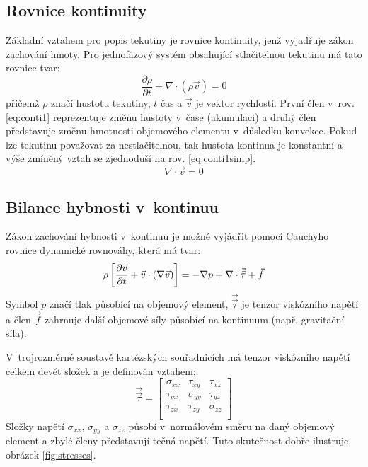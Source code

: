 \subsection{Rovnice kontinuity}

Základní vztahem pro popis tekutiny je rovnice kontinuity, jenž vyjadřuje zákon zachování hmoty. Pro jednofázový systém obsahující stlačitelnou tekutinu má tato rovnice tvar:
\begin{equation}
	\frac{\partial \rho}{\partial t} + \nabla \cdot (\rho\vec{v}) = 0
	\label{eq:conti1}
\end{equation}
přičemž $\rho$ značí hustotu tekutiny, $t$ čas a $\vec{v}$ je vektor rychlosti. První člen v~rov. \ref{eq:conti1} reprezentuje změnu hustoty v~čase (akumulaci) a druhý člen představuje změnu hmotnosti objemového elementu v~důsledku konvekce. Pokud lze tekutinu považovat za nestlačitelnou, tak hustota kontinua je konstantní a výše zmíněný vztah se zjednoduší na rov. \ref{eq:conti1simp}.
\begin{equation}
	\nabla \cdot \vec{v} = 0
	\label{eq:conti1simp}
\end{equation}  

\subsection{Bilance hybnosti v~kontinuu}
Zákon zachování hybnosti v~kontinuu je možné vyjádřit pomocí Cauchyho rovnice dynamické rovnováhy, která má tvar:
\begin{equation}
    \rho \left[ \frac{\partial \vec{v}}{\partial t} + \vec{v} \cdot \left( \nabla \vec{v} \right) \right] = -\nabla p +  \nabla \cdot \vec{\vec{\tau}} + \vec{f}
  	\label{eq:cauchy}
\end{equation} 
Symbol $p$ značí tlak působící na objemový element, $\vec{\vec{\tau}}$ je tenzor viskózního napětí a člen $\vec{f}$ zahrnuje další objemové síly působící na kontinuum (např. gravitační síla).

V~trojrozměrné soustavě kartézských souřadnicích má tenzor viskózního napětí celkem devět složek a je definován vztahem:
\begin{equation}
    \vec{\vec{\tau}} = 
    \begin{bmatrix}
      \sigma_{xx} & \tau_{xy} & \tau_{xz}\\ 
      \tau_{yx} & \sigma_{yy} & \tau_{yz}\\ 
      \tau_{zx} & \tau_{zy} & \sigma_{zz}\\ 
    \end{bmatrix}
  	\label{eq:tenstress}
\end{equation} 
Složky napětí $\sigma_{xx}$, $\sigma_{yy}$ a $\sigma_{zz}$ působí v~normálovém směru na daný objemový element a zbylé členy představují tečná napětí. Tuto skutečnost dobře ilustruje obrázek \ref{fig:stresses}. 

